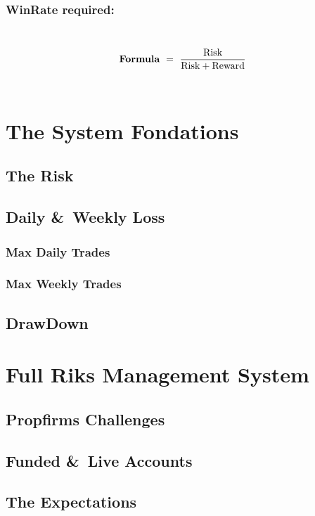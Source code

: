 \documentclass[10pt] {article}
\begin{document}
\subsubsection{WinRate required:} \
\[ \text{\textbf{Formula}}\ =\ \frac{\text{Risk}}{\text{Risk} + \text{Reward}}\] \

\section{The System Fondations}

\subsection{The Risk}

\subsection{Daily \&\ Weekly Loss}

\subsubsection{Max Daily Trades}

\subsubsection{Max Weekly Trades}

\subsection{DrawDown}

\section{Full Riks Management System} 

\subsection{Propfirms Challenges}

\subsection{Funded \&\ Live Accounts}

\subsection{The Expectations}






\end{document}
